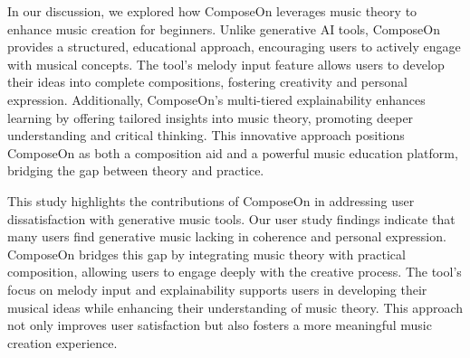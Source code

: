 In our discussion, we explored how ComposeOn leverages music theory to enhance music creation for beginners. Unlike generative AI tools, ComposeOn provides a structured, educational approach, encouraging users to actively engage with musical concepts. The tool's melody input feature allows users to develop their ideas into complete compositions, fostering creativity and personal expression. Additionally, ComposeOn's multi-tiered explainability enhances learning by offering tailored insights into music theory, promoting deeper understanding and critical thinking. This innovative approach positions ComposeOn as both a composition aid and a powerful music education platform, bridging the gap between theory and practice.

This study highlights the contributions of ComposeOn in addressing user dissatisfaction with generative music tools. Our user study findings indicate that many users find generative music lacking in coherence and personal expression. ComposeOn bridges this gap by integrating music theory with practical composition, allowing users to engage deeply with the creative process. The tool's focus on melody input and explainability supports users in developing their musical ideas while enhancing their understanding of music theory. This approach not only improves user satisfaction but also fosters a more meaningful music creation experience.

